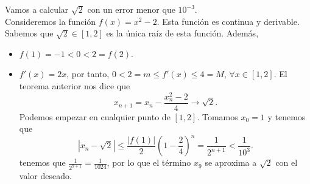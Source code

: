 \begin{eg}
\normalfont Vamos a calcular $\displaystyle \sqrt{2} $ con un error menor que $\displaystyle 10^{-3} $. \\
Consideremos la función $\displaystyle f\left(x\right) = x^{2}-2 $. Esta función es continua y derivable. Sabemos que $\displaystyle \sqrt{2} \in \left[1,2\right]  $ es la única raíz de esta función. Además,
\begin{itemize}
\item $\displaystyle f\left(1\right) = - 1 < 0 < 2 = f\left(2\right) $.
\item $\displaystyle f'\left(x\right) = 2x $, por tanto, $\displaystyle 0 < 2 = m \leq f'\left(x\right) \leq 4 = M $, $\displaystyle \forall x \in \left[1,2\right]  $. El teorema anterior nos dice que 
	\[x_{n+1} = x_{n}-\frac{x_{n}^{2}-2}{4} \to \sqrt{2} .\]
	Podemos empezar en cualquier punto de $\displaystyle \left[1,2\right]  $. Tomamos $\displaystyle x_{0}=1 $ y tenemos que
	\[ \left|x_{n}-\sqrt{2}\right| \leq \frac{ \left|f\left(1\right)\right|}{2} \left(1 - \frac{2}{4}\right)^{n} = \frac{1}{2^{n+1}} < \frac{1}{10^{3}} .\]
	tenemos que $\displaystyle \frac{1}{2^{9+1}}= \frac{1}{1024} $, por lo que el término $\displaystyle x_{9} $ se aproxima a $\displaystyle \sqrt{2} $ con el valor deseado.
\end{itemize}
\end{eg}

